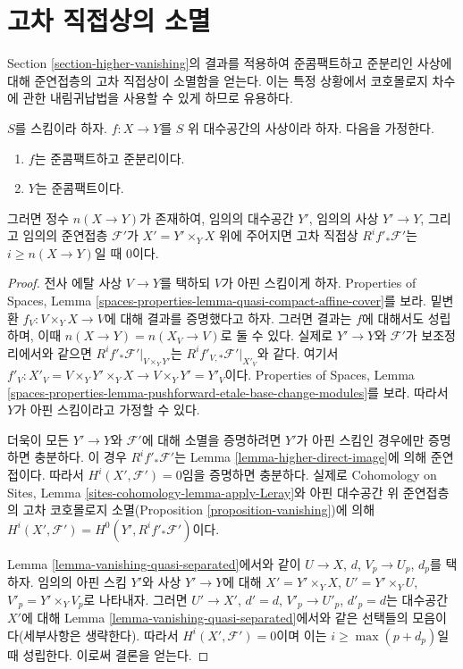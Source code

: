\section{고차 직접상의 소멸}
\label{section-vanishing-higher-direct-images}

\noindent
Section \ref{section-higher-vanishing}의 결과를 적용하여 준콤팩트하고
준분리인 사상에 대해 준연접층의 고차 직접상이 소멸함을 얻는다.
이는 특정 상황에서 코호몰로지 차수에 관한 내림귀납법을 사용할 수
있게 하므로 유용하다.

\begin{lemma}
\label{lemma-vanishing-higher-direct-images}
$S$를 스킴이라 하자. $f : X \to Y$를 $S$ 위 대수공간의
사상이라 하자. 다음을 가정한다.
\begin{enumerate}
\item $f$는 준콤팩트하고 준분리이다.
\item $Y$는 준콤팩트이다.
\end{enumerate}
그러면 정수 $n(X \to Y)$가 존재하여, 임의의 대수공간 $Y'$,
임의의 사상 $Y' \to Y$, 그리고 임의의 준연접층 $\mathcal{F}'$가
$X' = Y' \times_Y X$ 위에 주어지면 고차 직접상
$R^if'_*\mathcal{F}'$는 $i \geq n(X \to Y)$일 때 0이다.
\end{lemma}

\begin{proof}
전사 에탈 사상 $V \to Y$를 택하되 $V$가 아핀 스킴이게 하자.
Properties of Spaces, Lemma
\ref{spaces-properties-lemma-quasi-compact-affine-cover}를 보라.
밑변환 $f_V : V \times_Y X \to V$에 대해 결과를 증명했다고 하자.
그러면 결과는 $f$에 대해서도 성립하며, 이때
$n(X \to Y) = n(X_V \to V)$로 둘 수 있다. 실제로
$Y' \to Y$와 $\mathcal{F}'$가 보조정리에서와 같으면
$R^if'_*\mathcal{F}'|_{V \times_Y Y'}$는
$R^if'_{V, *}\mathcal{F}'|_{X'_V}$와 같다. 여기서
$f'_V : X'_V = V \times_Y Y' \times_Y X \to
V \times_Y Y' = Y'_V$이다. Properties of Spaces, Lemma
\ref{spaces-properties-lemma-pushforward-etale-base-change-modules}를 보라.
따라서 $Y$가 아핀 스킴이라고 가정할 수 있다.

\medskip\noindent
더욱이 모든 $Y' \to Y$와 $\mathcal{F}'$에 대해 소멸을 증명하려면
$Y'$가 아핀 스킴인 경우에만 증명하면 충분하다. 이 경우
$R^if'_*\mathcal{F}'$는 Lemma \ref{lemma-higher-direct-image}에 의해
준연접이다. 따라서 $H^i(X', \mathcal{F}') = 0$임을 증명하면 충분하다.
실제로 Cohomology on Sites, Lemma
\ref{sites-cohomology-lemma-apply-Leray}와 아핀 대수공간 위 준연접층의
고차 코호몰로지 소멸(Proposition \ref{proposition-vanishing})에 의해
$H^i(X', \mathcal{F}') = H^0(Y', R^if'_*\mathcal{F}')$이다.

\medskip\noindent
Lemma \ref{lemma-vanishing-quasi-separated}에서와 같이
$U \to X$, $d$, $V_p \to U_p$, $d_p$를 택하자. 임의의 아핀 스킴
$Y'$와 사상 $Y' \to Y$에 대해
$X' = Y' \times_Y X$, $U' = Y' \times_Y U$,
$V'_p = Y' \times_Y V_p$로 나타내자. 그러면
$U' \to X'$, $d' = d$, $V'_p \to U'_p$, $d'_p = d$는
대수공간 $X'$에 대해 Lemma \ref{lemma-vanishing-quasi-separated}에서와
같은 선택들의 모음이다(세부사항은 생략한다). 따라서
$H^i(X', \mathcal{F}') = 0$이며 이는 $i \geq \max(p + d_p)$일 때
성립한다. 이로써 결론을 얻는다.
\end{proof}

